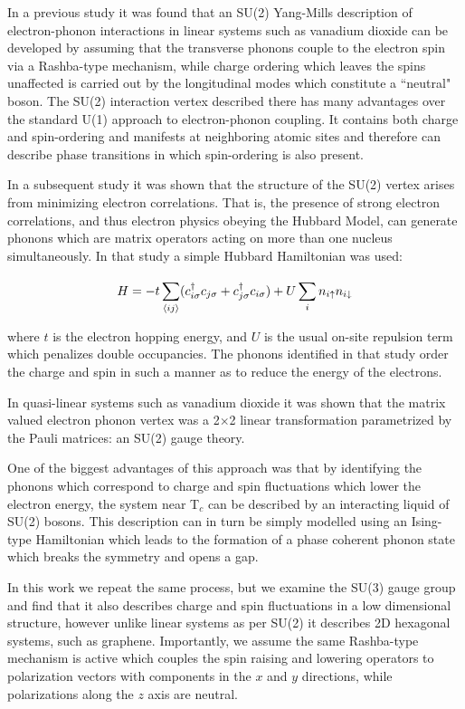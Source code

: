 \documentclass[prb,showpacs,superscriptaddress,titlepage,amsmath,amssymb,twocolumn]{revtex4-1}
\begin{document}
In a previous study\cite{Booth2020} it was found that an SU(2) Yang-Mills description of electron-phonon interactions in linear systems such as vanadium dioxide can be developed by assuming that the transverse phonons couple to the electron spin via a Rashba-type mechanism, while charge ordering which leaves the spins unaffected is carried out by the longitudinal modes which constitute a ``neutral" boson. The SU(2) interaction vertex described there has many advantages over the standard U(1) approach to electron-phonon coupling. It contains both charge and spin-ordering and manifests at neighboring atomic sites and therefore can describe phase transitions in which spin-ordering is also present.

In a subsequent study\cite{Booth_Wilson_2020} it was shown that the structure of the SU(2) vertex arises from minimizing electron correlations. That is, the presence of strong electron correlations, and thus electron physics obeying the Hubbard Model, can generate phonons which are matrix operators acting on more than one nucleus simultaneously. In that study a simple Hubbard Hamiltonian was used:

\begin{equation}
	H=-t\sum\limits_{\langle ij\rangle}^{}(c^{\dagger}_{i\sigma}c_{j\sigma}+c^{\dagger}_{j\sigma}c_{i\sigma})+\\U\sum\limits_{i}n_{i\uparrow}n_{i\downarrow}
	\label{HubbardH}
\end{equation}

where $t$ is the electron hopping energy, and $U$ is the usual on-site repulsion term which penalizes double occupancies. The phonons identified in that study order the charge and spin in such a manner as to reduce the energy of the electrons.

In quasi-linear systems such as vanadium dioxide it was shown that the matrix valued electron phonon vertex was a 2$\times$2 linear transformation parametrized by the Pauli matrices: an SU(2) gauge theory. 

One of the biggest advantages of this approach was that by identifying the phonons which correspond to charge and spin fluctuations which lower the electron energy, the system near T$_{c}$ can be described by an interacting liquid of SU(2) bosons. This description can in turn be simply modelled using an Ising-type Hamiltonian which leads to the formation of a phase coherent phonon state which breaks the symmetry and opens a gap\cite{Booth_Wilson_2020}.

In this work we repeat the same process, but we examine the SU(3) gauge group and find that it also describes charge and spin fluctuations in a low dimensional structure, however unlike linear systems as per SU(2) it describes 2D hexagonal systems, such as graphene. Importantly, we assume the same Rashba-type mechanism is active which couples the spin raising and lowering operators to polarization vectors with components in the $x$ and $y$ directions, while polarizations along the $z$ axis are neutral.
\end{document}
